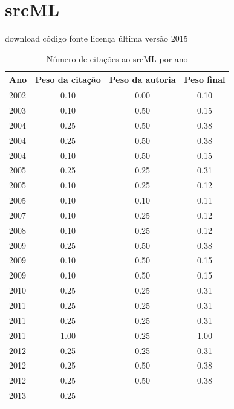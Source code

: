 \section{srcML}
\checkmark download
\checkmark código fonte
\checkmark licença
\checkmark última versão 2015
\begin{table}[H]
\caption{Número de citações ao srcML por ano}
\centering
\begin{tabular}{| l | c | c | c |}
  \hline
  Ano & Peso da citação & Peso da autoria & Peso final \\
  \hline
  2002
    & 0.10
    & 0.00
    & {\color{red} 0.10} \\
\hline
  2003
    & 0.10
    & 0.50
    & {\color{red} 0.15} \\
\hline
  2004
    & 0.25
    & 0.50
    & {\color{red} 0.38} \\
  2004
    & 0.25
    & 0.50
    & {\color{red} 0.38} \\
  2004
    & 0.10
    & 0.50
    & {\color{red} 0.15} \\
\hline
  2005
    & 0.25
    & 0.25
    & {\color{red} 0.31} \\
  2005
    & 0.10
    & 0.25
    & {\color{red} 0.12} \\
  2005
    & 0.10
    & 0.10
    & {\color{red} 0.11} \\
\hline
  2007
    & 0.10
    & 0.25
    & {\color{red} 0.12} \\
\hline
  2008
    & 0.10
    & 0.25
    & {\color{red} 0.12} \\
\hline
  2009
    & 0.25
    & 0.50
    & {\color{red} 0.38} \\
  2009
    & 0.10
    & 0.50
    & {\color{red} 0.15} \\
  2009
    & 0.10
    & 0.50
    & {\color{red} 0.15} \\
\hline
  2010
    & 0.25
    & 0.25
    & {\color{red} 0.31} \\
\hline
  2011
    & 0.25
    & 0.25
    & {\color{red} 0.31} \\
  2011
    & 0.25
    & 0.25
    & {\color{red} 0.31} \\
  2011
    & 1.00
    & 0.25
    & {\color{blue} 1.00} \\
\hline
  2012
    & 0.25
    & 0.25
    & {\color{red} 0.31} \\
  2012
    & 0.25
    & 0.50
    & {\color{red} 0.38} \\
  2012
    & 0.25
    & 0.50
    & {\color{red} 0.38} \\
\hline
  2013
    & 0.25

\end{tabular}
\end{table}

